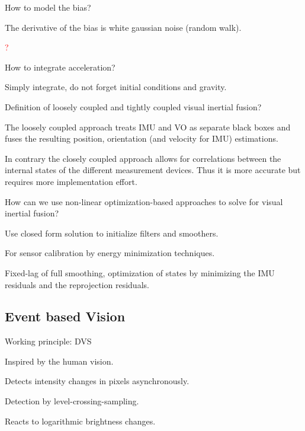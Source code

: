 \documentclass[10pt,a4paper]{scrartcl}
\begin{document}
\begin{multicols*}{2}
\begin{QandA}
{How to model the bias?}
\item The derivative of the bias is white gaussian noise (random walk).
\item \textcolor{red}{?}
\end{QandA}

\begin{QandA}
{How to integrate acceleration?}
\item Simply integrate, do not forget initial conditions and gravity.
\end{QandA}

\begin{QandA}
{Definition of loosely coupled and tightly coupled visual inertial fusion?}
\item The loosely coupled approach treats IMU and VO as separate black boxes and fuses the resulting position, orientation (and velocity for IMU) estimations.
\item In contrary the closely coupled approach allows for correlations between the internal states of the different measurement devices. Thus it is more accurate but requires more implementation effort.
\end{QandA}

\begin{QandA}
{How can we use non-linear optimization-based approaches to solve for visual inertial fusion?}
\item Use closed form solution to initialize filters and smoothers.
\item For sensor calibration by energy minimization techniques.
\item Fixed-lag of full smoothing, optimization of states by minimizing the IMU residuals and the reprojection residuals.
\end{QandA}

\subsection*{Event based Vision}

\begin{QandA}
{Working principle: DVS}
\item Inspired by the human vision.
\item Detects intensity changes in pixels asynchronously.
\item Detection by level-crossing-sampling.
\item Reacts to logarithmic brightness changes.


\end{QandA}
\end{multicols*}
\end{document}
